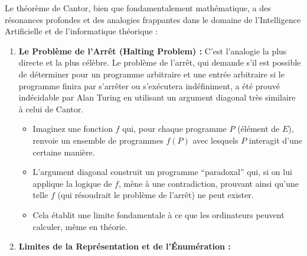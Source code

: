 \documentclass[12pt,a4paper]{report}
\providecommand{\tightlist}{%
  \setlength{\itemsep}{0pt}\setlength{\parskip}{0pt}}
\begin{document}
Le théorème de Cantor, bien que fondamentalement mathématique, a des
résonances profondes et des analogies frappantes dans le domaine de
l'Intelligence Artificielle et de l'informatique théorique :

\begin{enumerate}
\def\labelenumi{\arabic{enumi}.}
\item
  \textbf{Le Problème de l'Arrêt (Halting Problem) :} C'est l'analogie
  la plus directe et la plus célèbre. Le problème de l'arrêt, qui
  demande s'il est possible de déterminer pour un programme arbitraire
  et une entrée arbitraire si le programme finira par s'arrêter ou
  s'exécutera indéfiniment, a été prouvé indécidable par Alan Turing en
  utilisant un argument diagonal très similaire à celui de Cantor.

  \begin{itemize}
  \tightlist
  \item
    Imaginez une fonction \(f\) qui, pour chaque programme \(P\)
    (élément de \(E\)), renvoie un ensemble de programmes \(f(P)\) avec
    lesquels \(P\) interagit d'une certaine manière.
  \item
    L'argument diagonal construit un programme ``paradoxal'' qui, si on
    lui applique la logique de \(f\), mène à une contradiction, prouvant
    ainsi qu'une telle \(f\) (qui résoudrait le problème de l'arrêt) ne
    peut exister.
  \item
    Cela établit une limite fondamentale à ce que les ordinateurs
    peuvent calculer, même en théorie.
  \end{itemize}
\item
  \textbf{Limites de la Représentation et de l'Énumération :}


\end{enumerate}
\end{document}
